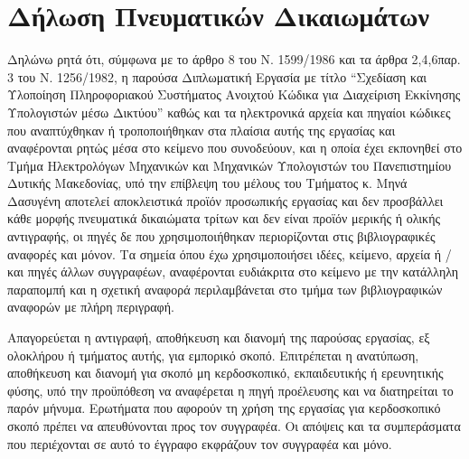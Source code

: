 \chapter*{Δήλωση Πνευματικών Δικαιωμάτων}
Δηλώνω ρητά ότι, σύμφωνα με το άρθρο 8 του Ν. 1599/1986 και τα άρθρα 2,4,6παρ. 3 του Ν. 1256/1982, η παρούσα Διπλωματική Εργασία με τίτλο ``Σχεδίαση και Υλοποίηση Πληροφοριακού Συστήματος Ανοιχτού Κώδικα για Διαχείριση Εκκίνησης Υπολογιστών μέσω Δικτύου'' καθώς και τα ηλεκτρονικά αρχεία και πηγαίοι κώδικες που αναπτύχθηκαν ή τροποποιήθηκαν στα πλαίσια αυτής της εργασίας και αναφέρονται ρητώς μέσα στο κείμενο που συνοδεύουν, και η οποία έχει εκπονηθεί στο Τμήμα Ηλεκτρολόγων Μηχανικών και Μηχανικών Υπολογιστών του Πανεπιστημίου Δυτικής Μακεδονίας, υπό την επίβλεψη του μέλους του Τμήματος κ. Μηνά Δασυγένη αποτελεί αποκλειστικά προϊόν προσωπικής εργασίας και δεν προσβάλλει κάθε μορφής πνευματικά δικαιώματα τρίτων και δεν είναι προϊόν μερικής ή ολικής αντιγραφής, οι πηγές δε που χρησιμοποιήθηκαν περιορίζονται στις βιβλιογραφικές αναφορές και μόνον. Τα σημεία όπου έχω χρησιμοποιήσει ιδέες, κείμενο, αρχεία ή / και πηγές άλλων συγγραφέων, αναφέρονται ευδιάκριτα στο κείμενο με την κατάλληλη παραπομπή και η σχετική αναφορά περιλαμβάνεται στο τμήμα των βιβλιογραφικών αναφορών με πλήρη περιγραφή.

Απαγορεύεται η αντιγραφή, αποθήκευση και διανομή της παρούσας εργασίας, εξ ολοκλήρου ή τμήματος αυτής, για εμπορικό σκοπό. Επιτρέπεται η ανατύπωση, αποθήκευση και διανομή για σκοπό μη κερδοσκοπικό, εκπαιδευτικής ή ερευνητικής φύσης, υπό την προϋπόθεση να αναφέρεται η πηγή προέλευσης και να διατηρείται το παρόν μήνυμα. Ερωτήματα που αφορούν τη
χρήση της εργασίας για κερδοσκοπικό σκοπό πρέπει να απευθύνονται προς τον συγγραφέα. Οι απόψεις και τα συμπεράσματα που περιέχονται σε αυτό το έγγραφο εκφράζουν τον συγγραφέα και μόνο.

\vfill

\begin{center}
\end{center}
